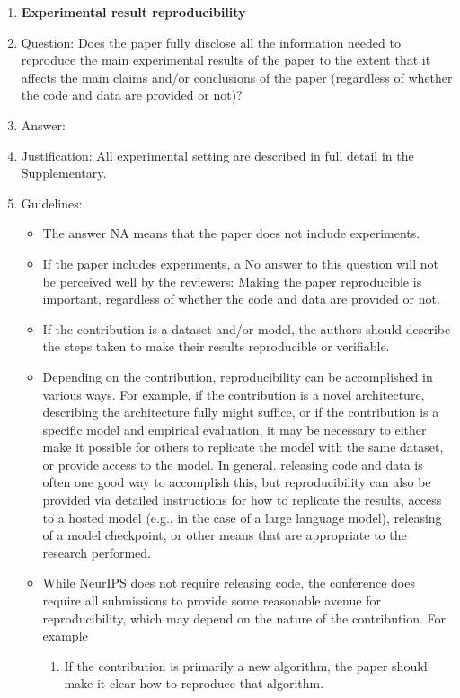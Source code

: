 \documentclass{article}
\theoremstyle{definition} \newtheorem{definition}{Definition}  \newtheorem{example}{Example}
\theoremstyle{remark} \newtheorem{remark}{Remark}
\newcounter{ct}
\begin{document}
\begin{enumerate}
    \item {\bf Experimental result reproducibility}
    \item[] Question: Does the paper fully disclose all the information needed to reproduce the main experimental results of the paper to the extent that it affects the main claims and/or conclusions of the paper (regardless of whether the code and data are provided or not)?
    \item[] Answer: \answerYes{} %
    \item[] Justification: All experimental setting are described in full detail in the Supplementary.
    \item[] Guidelines:
    \begin{itemize}
        \item The answer NA means that the paper does not include experiments.
        \item If the paper includes experiments, a No answer to this question will not be perceived well by the reviewers: Making the paper reproducible is important, regardless of whether the code and data are provided or not.
        \item If the contribution is a dataset and/or model, the authors should describe the steps taken to make their results reproducible or verifiable. 
        \item Depending on the contribution, reproducibility can be accomplished in various ways. For example, if the contribution is a novel architecture, describing the architecture fully might suffice, or if the contribution is a specific model and empirical evaluation, it may be necessary to either make it possible for others to replicate the model with the same dataset, or provide access to the model. In general. releasing code and data is often one good way to accomplish this, but reproducibility can also be provided via detailed instructions for how to replicate the results, access to a hosted model (e.g., in the case of a large language model), releasing of a model checkpoint, or other means that are appropriate to the research performed.
        \item While NeurIPS does not require releasing code, the conference does require all submissions to provide some reasonable avenue for reproducibility, which may depend on the nature of the contribution. For example
        \begin{enumerate}
            \item If the contribution is primarily a new algorithm, the paper should make it clear how to reproduce that algorithm.

\end{enumerate}
\end{itemize}
\end{enumerate}
\end{document}
